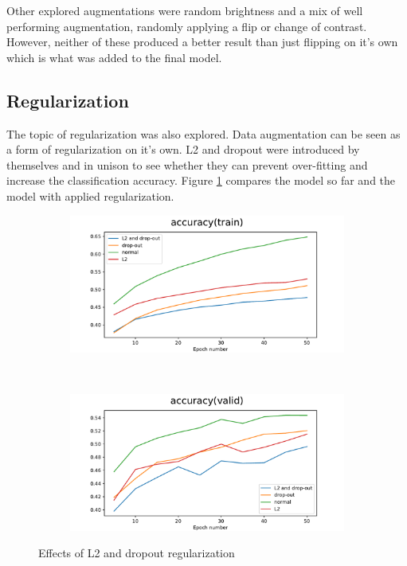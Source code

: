 \documentclass[12pt]{article}
\begin{document}
Other explored augmentations were random brightness and a mix of well performing augmentation, randomly applying a flip or change of contrast. However, neither of these produced a better result than just flipping on it's own which is what was added to the final model.

\subsection*{Regularization}

The topic of regularization was also explored. Data augmentation can be seen as a form of regularization on it's own. L2 and dropout were introduced by themselves and in unison to see whether they can prevent over-fitting and increase the classification accuracy. Figure \ref{fig:reg} compares the model so far and the model with applied regularization.

\begin{figure}[ht!]
    \centering
    \begin{subfigure}[t]{0.475\textwidth}
        \centering
        \includegraphics[width=1.0\linewidth]{hidden_units_layers_4_flip_reg_accuracy(train).pdf}
    \end{subfigure}%
    ~ 
    \begin{subfigure}[t]{0.475\textwidth}
        \centering
        \includegraphics[width=1.0\linewidth]{hidden_units_layers_4_flip_reg_accuracy(valid).pdf}
    \end{subfigure}
   \caption{Effects of L2 and dropout regularization }
    \label{fig:reg}
\end{figure}
\end{document}
